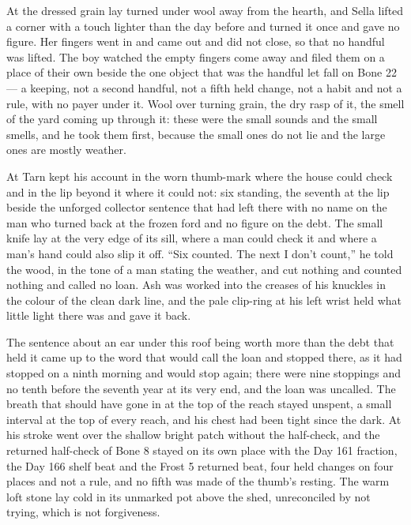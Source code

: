 \scenebreak

At  the dressed grain lay turned under wool away from the hearth, and Sella lifted a corner with a touch lighter than the day before and turned it once and gave no figure. Her fingers went in and came out and did not close, so that no handful was lifted. The boy watched the empty fingers come away and filed them on a place of their own beside the one object that was the handful let fall on Bone 22 --- a keeping, not a second handful, not a fifth held change, not a habit and not a rule, with no payer under it. Wool over turning grain, the dry rasp of it, the smell of the yard coming up through it: these were the small sounds and the small smells, and he took them first, because the small ones do not lie and the large ones are mostly weather.

At  Tarn kept his account in the worn thumb-mark where the house could check and in the lip beyond it where it could not: six standing, the seventh at the lip beside the unforged collector sentence that  had left there with no name on the man who turned back at the frozen ford and no figure on the debt. The small knife lay at the very edge of its sill, where a man could check it and where a man's hand could also slip it off. “Six counted. The next I don't count,” he told the wood, in the tone of a man stating the weather, and cut nothing and counted nothing and called no loan. Ash was worked into the creases of his knuckles in the colour of the clean dark line, and the pale clip-ring at his left wrist held what little light there was and gave it back.

The sentence about an ear under this roof being worth more than the debt that held it came up to the word that would call the loan and stopped there, as it had stopped on a ninth morning and would stop again; there were nine stoppings and no tenth before the seventh year at its very end, and the loan was uncalled. The breath that should have gone in at the top of the reach stayed unspent, a small interval at the top of every reach, and his chest had been tight since the dark. At  his stroke went over the shallow bright patch without the half-check, and the returned half-check of Bone 8 stayed on its own place with the Day 161 fraction, the Day 166 shelf beat and the Frost 5 returned beat, four held changes on four places and not a rule, and no fifth was made of the thumb's resting. The warm loft stone lay cold in its unmarked pot above the shed, unreconciled by not trying, which is not forgiveness.

